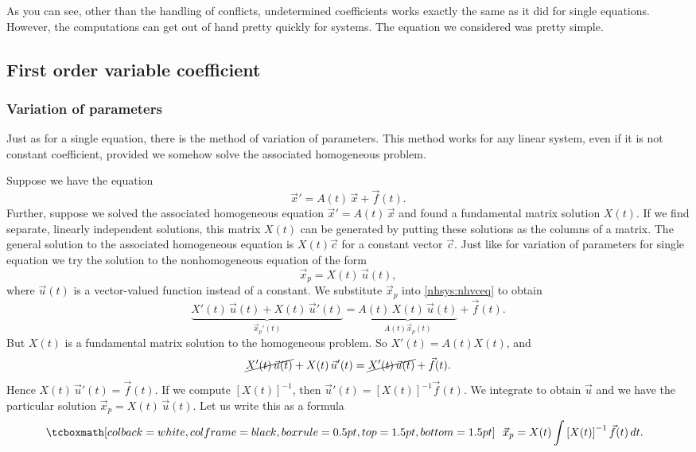 As you can see, other than the handling of conflicts, undetermined
coefficients works exactly the same as it did for
single equations.  However, the computations can get out of hand pretty
quickly for systems.  The equation we considered was pretty simple.

\subsection{First order variable coefficient}

\subsubsection{Variation of parameters}

Just as for a single equation, there is the method of
variation of parameters.
This method works for any linear system, even if it is not
constant coefficient, provided we somehow solve the associated
homogeneous problem.

Suppose we have the equation
\begin{equation} \label{nhsys:nhvceq}
{\vec{x}}' = A(t) \, \vec{x} + \vec{f}(t) .
\end{equation}
Further, suppose we solved the associated homogeneous equation
${\vec{x}}' = A(t) \, \vec{x}$ and found
a fundamental matrix solution
$X(t)$. If we find separate, linearly independent solutions, this matrix $X(t)$ can be generated by putting these solutions as the columns of a matrix. The general solution to the associated homogeneous equation
is $X(t) \vec{c}$ for a constant vector $\vec{c}$.  Just like for
variation of parameters for single equation we try the solution
to the nonhomogeneous equation of the form
\begin{equation*}
\vec{x}_p = X(t)\, \vec{u}(t) ,
\end{equation*}
where $\vec{u}(t)$ is a vector-valued function instead of a constant.
We substitute $\vec{x}_p$ into \eqref{nhsys:nhvceq} to obtain
\begin{equation*}
\underbrace{X'(t)\, \vec{u}(t) + X(t)\, {\vec{u}}'(t)}%
_{{\vec{x}_p}'(t)}
=
\underbrace{A(t)\, X(t)\, \vec{u}(t)}%
_{A(t) \vec{x}_p (t)} 
 + \vec{f}(t) .
\end{equation*}
But $X(t)$ is a fundamental matrix solution to the homogeneous problem.
So $X'(t) = A(t)X(t)$, and
\begin{equation*}
\cancel{X'(t)\, \vec{u}(t)} + X(t)\, {\vec{u}}'(t)
=
\cancel{X'(t)\, \vec{u}(t)} + \vec{f}(t) .
\end{equation*}
Hence
$X(t)\, {\vec{u}}'(t) = \vec{f}(t)$.  If we compute
$\left[X(t)\right]^{-1}$,
then
${\vec{u}}'(t) = \left[X(t)\right]^{-1}\vec{f}(t)$.  We integrate
to obtain $\vec{u}$ and we have the particular solution
$\vec{x}_p = X(t)\, \vec{u}(t)$.
Let us write this as a formula
\begin{equation*}
\mybxbg{~~
\vec{x}_p = 
X(t)
\int \left[X(t)\right]^{-1}\vec{f}(t) \, dt .
~~}
\end{equation*}

